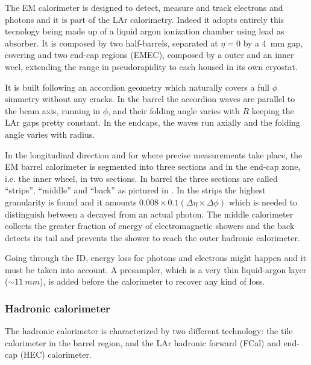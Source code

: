 The EM calorimeter is designed to detect, measure and track electrons and photons and it is part of the LAr calorimetry. Indeed it adopts entirely this tecnology being made up of a liquid argon ionization chamber using lead as absorber. It is composed by two half-barrels, separated at $\eta=0$ by a \SI{4}{mm} gap, covering  and two end-cap regions (EMEC), composed by a outer and an inner weel, extending the range in pseudorapidity to  each housed in its own cryostat. 

It is  built following an accordion geometry which naturally covers a full $\phi$ simmetry without any cracks. In the barrel the accordion waves are parallel to the beam axis, running in $\phi$, and their folding angle varies with $R$ keeping the LAr gaps pretty constant. In the endcaps, the waves run axially and the folding angle varies with radius.

In the longitudinal direction and for  where precise measurements take place, the EM barrel calorimeter is segmented into three sections and in the end-cap zone, i.e. the inner wheel, in two sections. In barrel the three sections are called ``strips'', ``middle'' and ``back'' as pictured in \Fig{\ref{fig:EMlayers}}. In the strips the highest granularity is found and it amounts $0.008 \times 0.1 \left(\Delta \eta \times \Delta \phi \right)$ which is needed to distinguish between a decayed \pizero from an actual photon. The middle calorimeter collects the greater fraction of energy of electromagnetic showers and the back detects its tail and prevents the shower to reach the outer hadronic calorimeter.
  
Going through the ID, energy loss for photons and electrons might happen and it must be taken into account. A presampler, which is a very thin liquid-argon layer ($\sim \SI{11}{mm}$), is added before the calorimeter to recover any kind of loss.

\subsubsection{Hadronic calorimeter}
The hadronic calorimeter is characterized by two different technology: the tile calorimeter in the barrel region, and the LAr hadronic forward (FCal) and end-cap (HEC) calorimeter. 

